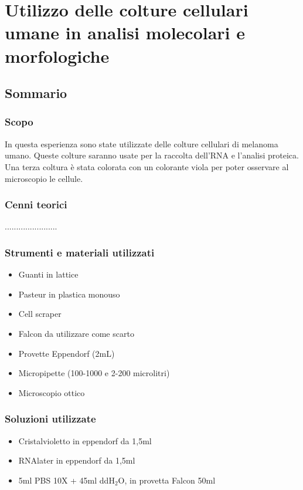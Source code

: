 \section{\LARGE{Utilizzo delle colture cellulari umane in analisi molecolari e morfologiche}}

\vspace{0.6cm}

\subsection{Sommario}

\subsubsection{Scopo}

In questa esperienza sono state utilizzate delle colture cellulari 
di melanoma umano.
Queste colture saranno usate per la raccolta dell'RNA e l'analisi proteica.
Una terza coltura è stata colorata con un colorante viola per poter
osservare al microscopio le cellule.

\subsubsection{Cenni teorici}

.......................

\subsubsection{Strumenti e materiali utilizzati}

\begin{itemize}
\item Guanti in lattice
\item Pasteur in plastica monouso
\item Cell scraper
\item Falcon da utilizzare come scarto
\item Provette Eppendorf (2mL)
\item Micropipette (100-1000  e 2-200 microlitri)
\item Microscopio ottico
\end{itemize}

\subsubsection{Soluzioni utilizzate}

\begin{itemize}
\item Cristalvioletto in eppendorf da 1,5ml
\item RNAlater in eppendorf da 1,5ml
\item 5ml PBS 10X + 45ml ddH$_2$O, in provetta Falcon 50ml
\end{itemize}

